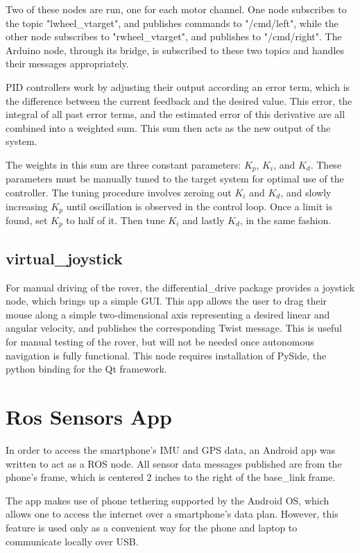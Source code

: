 Two of these nodes are run, one for each motor channel. One node subscribes to the topic "lwheel\_vtarget", and publishes commands to "/cmd/left", while the other node subscribes to "rwheel\_vtarget", and publishes to "/cmd/right". The Arduino node, through its bridge, is subscribed to these two topics and handles their messages appropriately.

PID controllers work by adjusting their output according an error term, which is the difference between the current feedback and the desired value. This error, the integral of all past error terms, and the estimated error of this derivative are all combined into a weighted sum. This sum then acts as the new output of the system.

The weights in this sum are three constant parameters: \(K_p\), \(K_i\), and \(K_d\). These parameters must be manually tuned to the target system for optimal use of the controller. The tuning procedure involves zeroing out \(K_i\) and \(K_d\), and slowly increasing \(K_p\) until oscillation is observed in the control loop. Once a limit is found, set \(K_p\) to half of it. Then tune \(K_i\) and lastly \(K_d\), in the same fashion. 

\subsection{virtual\_joystick} \label{sectionJoystick}
For manual driving of the rover, the differential\_drive package provides a joystick node, which brings up a simple GUI. This app allows the user to drag their mouse along a simple two-dimensional axis representing a desired linear and angular velocity, and publishes the corresponding Twist message. This is useful for manual testing of the rover, but will not be needed once autonomous navigation is fully functional. This node requires installation of PySide, the python binding for the Qt framework.

\section{Ros Sensors App}
In order to access the smartphone's IMU and GPS data, an Android app was written to act as a ROS node. All sensor data messages published are from the phone's frame, which is centered 2 inches to the right of the base\_link frame.

The app makes use of phone tethering supported by the Android OS, which allows one to access the internet over a smartphone's data plan. However, this feature is used only as a convenient way for the phone and laptop to communicate locally over USB.

